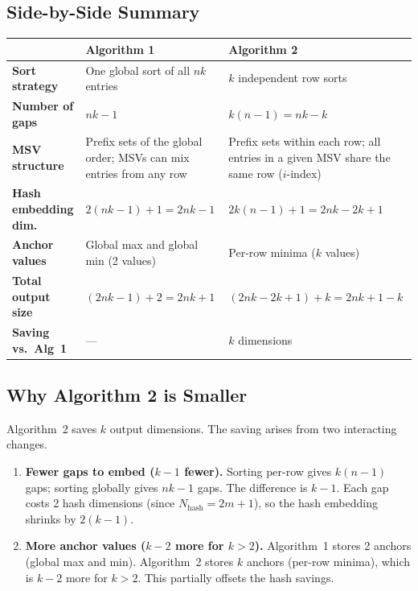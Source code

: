 \documentclass[11pt,a4paper]{article}
\begin{document}
\subsection*{Side-by-Side Summary}

\begin{center}
\renewcommand{\arraystretch}{1.4}
\begin{tabular}{p{4.5cm} p{4.5cm} p{4.5cm}}
  \toprule
  & \textbf{\textcolor{alg1}{Algorithm 1}} & \textbf{\textcolor{alg2}{Algorithm 2}} \\
  \midrule
  \textbf{Sort strategy} &
    One global sort of all $nk$ entries &
    $k$ independent row sorts \\
  \textbf{Number of gaps} &
    $nk - 1$ &
    $k(n-1) = nk - k$ \\
  \textbf{MSV structure} &
    Prefix sets of the global order; MSVs can mix entries from any row &
    Prefix sets within each row; all entries in a given MSV share the same row ($i$-index) \\
  \textbf{Hash embedding dim.} &
    $2(nk-1)+1 = 2nk-1$ &
    $2k(n-1)+1 = 2nk-2k+1$ \\
  \textbf{Anchor values} &
    Global max and global min (2 values) &
    Per-row minima ($k$ values) \\
  \textbf{Total output size} &
    $(2nk-1) + 2 = 2nk+1$ &
    $(2nk-2k+1) + k = 2nk+1-k$ \\
  \midrule
  \textbf{Saving vs.\ Alg~1} & — & $k$ dimensions \\
  \bottomrule
\end{tabular}
\end{center}

\subsection*{Why Algorithm 2 is Smaller}

Algorithm~2 saves $k$ output dimensions.  The saving arises from two
interacting changes.

\begin{enumerate}
  \item \textbf{Fewer gaps to embed ($k{-}1$ fewer).}
        Sorting per-row gives $k(n-1)$ gaps; sorting globally gives $nk-1$
        gaps.  The difference is $k{-}1$.  Each gap costs 2 hash dimensions
        (since $N_{\text{hash}} = 2m+1$), so the hash embedding shrinks by
        $2(k-1)$.

  \item \textbf{More anchor values ($k{-}2$ more for $k > 2$).}
        Algorithm~1 stores 2 anchors (global max and min).  Algorithm~2 stores
        $k$ anchors (per-row minima), which is $k-2$ more for $k > 2$.
        This partially offsets the hash savings.
\end{enumerate}
\end{document}
